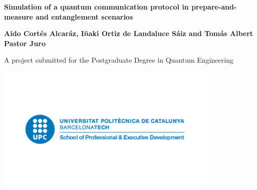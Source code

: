\begin{titlepage}
   \begin{center}
       \vspace*{1cm}

       \Large
       \textbf{Simulation of a quantum communication protocol in prepare-and-measure and entanglement scenarios}

       \vspace{0.8cm}

       \normalsize
       \textbf{Aido Cort\'es Alcar\'az, I\~{n}aki Ortiz de Landaluce S\'aiz and Tom\'as Albert Pastor Juro}

       \vfill
            
       \footnotesize{A project submitted for the Postgraduate Degree in Quantum Engineering}
            
       \includegraphics[width=0.8\textwidth]{images/upc.png}
            
       \date{\today}
            
   \end{center}
\end{titlepage}